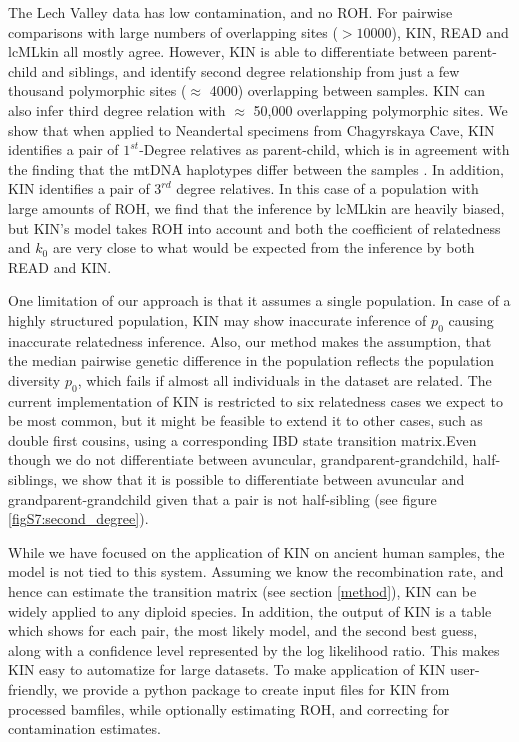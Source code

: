 \documentclass[12pt, letterpaper]{article}
\begin{document}
The Lech Valley data  has low contamination, and no ROH. For pairwise comparisons with large numbers of overlapping sites ($>10000$), KIN, READ and lcMLkin all mostly agree. However, KIN is able to differentiate between parent-child and siblings, and identify second degree relationship from just a few thousand polymorphic sites ($\approx$ 4000) overlapping between samples. KIN can also infer third degree relation with $\approx$ 50,000 overlapping polymorphic sites. We show that when applied to Neandertal specimens from Chagyrskaya Cave, KIN identifies a pair of $1^{st}$-Degree relatives as parent-child, which is in agreement with the finding that the mtDNA haplotypes differ between the samples \cite{laurits_skov_genetic_nodate}. In addition, KIN identifies a pair of $3^{rd}$ degree relatives. In this case of a population with large amounts of ROH, we find that the inference by lcMLkin are heavily biased, but KIN's model takes ROH into account and both the coefficient of relatedness and $k_0$ are very close to what would be expected from the inference by both READ and KIN. 

One limitation of our approach is that it assumes a single population. In case of a highly structured population, KIN may show inaccurate inference of $p_0$ causing inaccurate relatedness inference. Also, our method makes the assumption, that the median pairwise genetic difference in the population reflects the population diversity $p_0$, which fails if almost all individuals in the dataset are related. The current implementation of KIN is restricted to six relatedness cases we expect to be most common, but it might be feasible to extend it to other cases, such as double first cousins, using a corresponding IBD state transition matrix.Even though we do not differentiate between avuncular, grandparent-grandchild, half-siblings, we show that it is possible to differentiate between avuncular and grandparent-grandchild given that a pair is not half-sibling (see figure \ref{figS7:second_degree}).

While we have focused on the application of KIN on ancient human samples, the model is not tied to this system. Assuming we know the recombination rate, and hence can estimate the transition matrix (see section \ref{method}), KIN can be widely applied to any diploid species. In addition, the output of KIN is a table which shows for each pair, the most likely model, and the second best guess, along with a confidence level represented by the log likelihood ratio. This makes KIN easy to automatize for large datasets. To make application of KIN user-friendly, we provide a python package to create input files for KIN from processed bamfiles, while optionally estimating ROH, and correcting for contamination estimates. 
\end{document}
